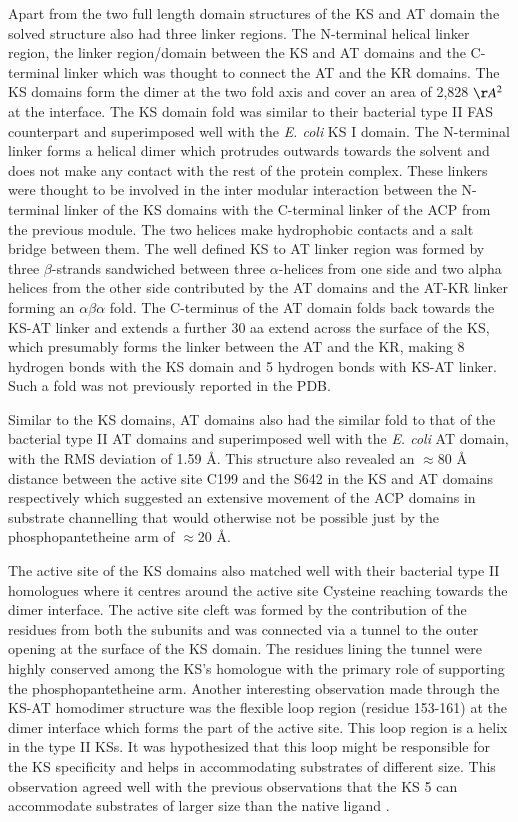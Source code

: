 		Apart from the two full length domain structures of the KS and AT domain the solved structure also had three linker regions. The N-terminal helical linker region, the linker region/domain between the KS and AT domains and the C-terminal linker which was thought to connect the AT and the KR domains. The KS domains form the dimer at the two fold axis and cover an area of 2,828 $ \AA{}^{2} $ at the interface. The KS domain fold was similar to their bacterial type II FAS counterpart and superimposed well with the \textit{E. coli} KS I domain. The N-terminal linker forms a helical dimer which protrudes outwards towards the solvent and does not make any contact with the rest of the protein complex. These linkers were thought to be involved in the inter modular interaction between the N-terminal linker of the KS domains with the C-terminal linker of the ACP from the previous module.  The two helices make hydrophobic contacts and a salt bridge between them. The well defined KS to AT linker region was formed by three $ \beta $-strands sandwiched between three $ \alpha $-helices from one side and two alpha helices from the other side contributed by the AT domains and the AT-KR linker forming an $ \alpha\beta\alpha $ fold. The C-terminus of the AT domain folds back towards the KS-AT linker and extends a further 30 aa extend across the surface of the KS, which presumably forms the linker between the AT and the KR, making 8 hydrogen bonds with the KS domain and 5 hydrogen bonds with KS-AT linker. Such a fold was not previously reported in the PDB. 
		
		Similar to the KS domains, AT domains also had the similar fold to that of the bacterial type II AT domains and superimposed well with the \textit{E. coli} AT domain, with the RMS deviation of 1.59 \AA{}. This structure also revealed an $\approx$80 \AA{} distance between the active site C199 and the S642 in the KS and AT domains respectively which suggested an extensive movement of the ACP domains in substrate channelling that would otherwise not be possible just by the phosphopantetheine arm of $\approx$20 \AA{}. 
		
		The active site of the KS domains also matched well with their bacterial type II homologues where it centres around the active site Cysteine reaching towards the dimer interface. The active site cleft was formed by the contribution of the residues from both the subunits and was connected via a tunnel to the outer opening at the surface of the KS domain. The residues lining the tunnel were highly conserved among the KS's homologue with the primary role of supporting the phosphopantetheine arm. Another interesting observation made through the KS-AT homodimer structure was the flexible loop region (residue 153-161) at the dimer interface which forms the part of the active site. This loop region is a helix in the type II KSs. It was hypothesized that this loop might be responsible for the KS specificity and helps in accommodating substrates of different size. This observation agreed well with the previous observations that the KS 5 can accommodate substrates of larger size than the native ligand \parencite{Tang2006}.
		
